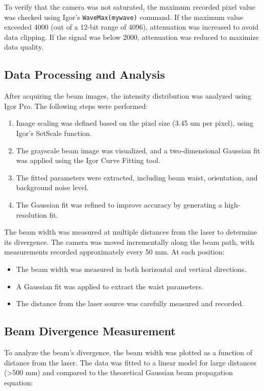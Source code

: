 \documentclass[12pt]{article}
\begin{document}
To verify that the camera was not saturated, the maximum recorded pixel value was checked using Igor’s \texttt{WaveMax(mywave)} command. If the maximum value exceeded 4000 (out of a 12-bit range of 4096), attenuation was increased to avoid data clipping. If the signal was below 2000, attenuation was reduced to maximize data quality.

\subsection{Data Processing and Analysis}
After acquiring the beam images, the intensity distribution was analyzed using Igor Pro. The following steps were performed:
\begin{enumerate}
    \item Image scaling was defined based on the pixel size (3.45 um per pixel), using Igor’s SetScale function.
    \item The grayscale beam image was visualized, and a two-dimensional Gaussian fit was applied using the Igor Curve Fitting tool.
    \item The fitted parameters were extracted, including beam waist, orientation, and background noise level.
    \item The Gaussian fit was refined to improve accuracy by generating a high-resolution fit.
\end{enumerate}

The beam width was measured at multiple distances from the laser to determine its divergence. The camera was moved incrementally along the beam path, with measurements recorded approximately every 50 mm. At each position:
\begin{itemize}
    \item The beam width was measured in both horizontal and vertical directions.
    \item A Gaussian fit was applied to extract the waist parameters.
    \item The distance from the laser source was carefully measured and recorded.
\end{itemize}

\subsection{Beam Divergence Measurement}
To analyze the beam’s divergence, the beam width was plotted as a function of distance from the laser. The data was fitted to a linear model for large distances (\textgreater 500 mm) and compared to the theoretical Gaussian beam propagation equation:
\end{document}
